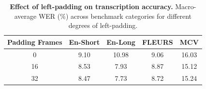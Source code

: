 
\begin{table}[t]
\centering
\caption{\textbf{Effect of left-padding on transcription accuracy.} Macro-average WER (\%) across benchmark categories for different degrees of left-padding.}
\label{tab:left-padding}
\begin{tabular}{ccccc}
\toprule
\textbf{Padding Frames} & \textbf{En-Short} & \textbf{En-Long} & \textbf{FLEURS} & \textbf{MCV} \\
\midrule
0 & 9.10 & 10.98 & 9.06 & 16.03 \\
16 & 8.53 & 7.93  & 8.87 & 15.12 \\
32 & 8.47 & 7.73 & 8.72 & 15.24 \\
\bottomrule
\end{tabular}
\end{table}